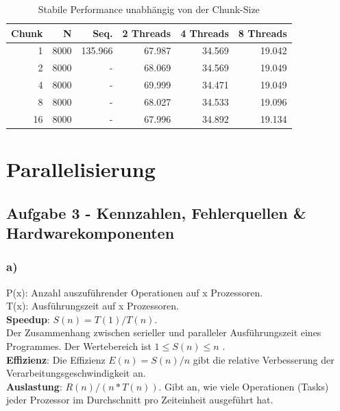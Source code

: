 \documentclass{report}
\begin{document}
			\begin{table}
				\begin{tabular}{|r|r|r|r|r|r|}
					\hline
					Chunk & N & Seq. & 2 Threads & 4 Threads & 8 Threads \\
					\hline
					1 & 8000 & 135.966 & 67.987  & 34.569  & 19.042  \\
					\hline
					2 & 8000 & - & 68.069 & 34.569  & 19.049  \\
					\hline
					4 & 8000 & - & 69.999  & 34.471  & 19.049  \\
					\hline
					8 & 8000 & - & 68.027  & 34.533  & 19.096  \\
					\hline
					16 & 8000 & - & 67.996  & 34.892  & 19.134  \\
					\hline
				\end{tabular}
				\caption{Stabile Performance unabhängig von der Chunk-Size}
				\label{Table:2c2}
			\end{table}

\section{Parallelisierung}
    \subsection{Aufgabe 3 - Kennzahlen, Fehlerquellen \& Hardwarekomponenten}
    
        \subsubsection{a)}
        P(x): Anzahl auszuführender Operationen auf x Prozessoren.\\
        T(x): Ausführungszeit auf x Prozessoren.\\
        
        \textbf{Speedup}:  $S(n) = T(1)/T(n) $. \\ Der Zusammenhang zwischen serieller und paralleler Ausführungszeit eines Programmes. Der Wertebereich ist $ 1 \leq S(n) \leq n $ .\\
        
        \textbf{Effizienz}: Die Effizienz $ E(n) = S(n)/n $ gibt die relative Verbesserung der Verarbeitungsgeschwindigkeit an.\\
        
        \textbf{Auslastung}: $ R(n)/(n*T(n)) $. Gibt an, wie viele Operationen (Tasks) jeder Prozessor im Durchschnitt pro Zeiteinheit ausgeführt hat.\\
        
\end{document}
